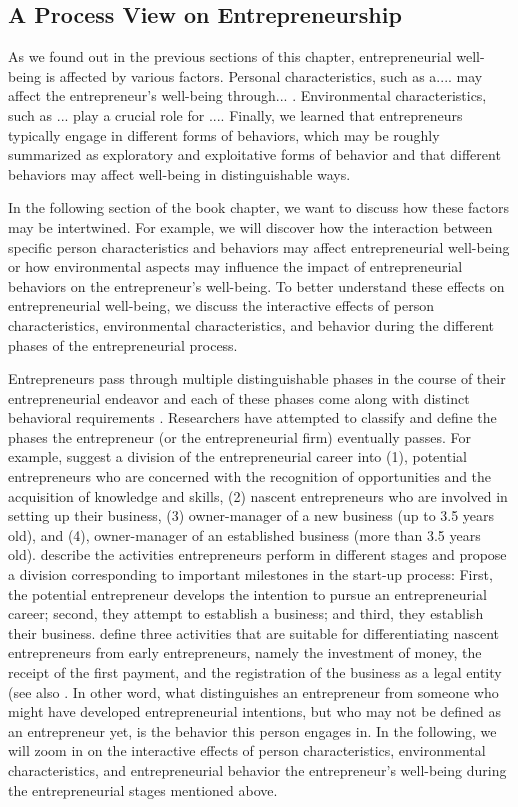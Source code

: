 \documentclass[a4paper,man,noextraspace,natbib]{apa6}
\begin{document}
\subsection{A Process View on Entrepreneurship}
As we found out in the previous sections of this chapter, entrepreneurial well-being is affected by various factors. Personal characteristics, such as a.... may affect the entrepreneur's well-being through... . Environmental characteristics, such as ... play a crucial role for .... Finally, we learned that entrepreneurs typically engage in different forms of behaviors, which may be roughly summarized as exploratory and exploitative forms of behavior and that different behaviors may affect well-being in distinguishable ways. \par
In the following section of the book chapter, we want to discuss how these factors may be intertwined. For example, we will discover how the interaction between specific person characteristics and behaviors may affect entrepreneurial well-being or how environmental aspects may influence the impact of entrepreneurial behaviors on the entrepreneur's well-being. To better understand these effects on entrepreneurial well-being, we discuss the interactive effects of person characteristics, environmental characteristics, and behavior during the different phases of the entrepreneurial process. \par
Entrepreneurs pass through multiple distinguishable phases in the course of their entrepreneurial endeavor and each of these phases come along with distinct behavioral requirements \cite[e.g.][]{Baron.2002, vanGelderen.2005}. Researchers have attempted to classify and define the phases the entrepreneur (or the entrepreneurial firm) eventually passes. For example, \cite{Bosma.2019} suggest a division of the entrepreneurial career into (1), potential entrepreneurs who are concerned with the recognition of opportunities and the acquisition of knowledge and skills, (2) nascent entrepreneurs who are involved in setting up their business, (3) owner-manager of a new business (up to 3.5 years old), and (4), owner-manager of an established business (more than 3.5 years old). \cite{Rotefoss.2005} describe the activities entrepreneurs perform in different stages and propose a division corresponding to important milestones in the start-up process: First, the potential entrepreneur develops the intention to pursue an entrepreneurial career; second, they attempt to establish a business; and third, they establish their business. \cite{Rotefoss.2005} define three activities that are suitable for differentiating nascent entrepreneurs from early entrepreneurs, namely the investment of money, the receipt of the first payment, and the registration of the business as a legal entity (see also \cite{Reynolds.1992}. In other word, what distinguishes an entrepreneur from someone who might have developed entrepreneurial intentions, but who may not be defined as an entrepreneur yet, is the behavior this person engages in. In the following, we will zoom in on the interactive effects of person characteristics, environmental characteristics, and entrepreneurial behavior the entrepreneur's well-being during the entrepreneurial stages mentioned above. 
\end{document}
